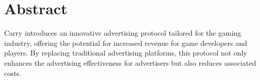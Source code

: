 \documentclass[
10pt, %
a4paper, %
oneside, %
headinclude,footinclude, %
BCOR5mm, %
]{scrartcl}
\title{\normalfont\spacedallcaps{Carry Protocol}} %
\author{\spacedlowsmallcaps{ Andy Pan\textsuperscript{1}}} %
\date{} %
\begin{document}

\renewcommand{\sectionmark}[1]{\markright{\spacedlowsmallcaps{#1}}} %
\lehead{\mbox{\llap{\small\thepage\kern1em\color{halfgray} \vline}\color{halfgray}\hspace{0.5em}\rightmark\hfil}} %

\pagestyle{scrheadings} %


\maketitle %

\setcounter{tocdepth}{2} %

\tableofcontents %

\listoffigures %

\listoftables %

\let\thefootnote\relax{}

\newpage
\section*{Abstract} %

Carry introduces an innovative advertising protocol tailored for the gaming industry, offering the potential for increased revenue for game developers and players. By replacing traditional advertising platforms, this protocol not only enhances the advertising effectiveness for advertisers but also reduces associated costs.\\
\end{document}
